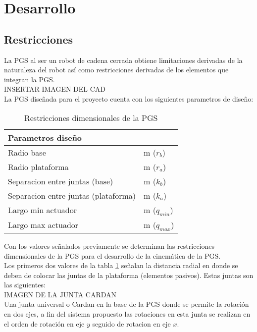 \documentclass[letterpaper, 12pt]{article}
\begin{document}
\section{Desarrollo}
\subsection{Restricciones}
La PGS al ser un robot de cadena cerrada obtiene limitaciones 
derivadas de la naturaleza del robot así como restricciones 
derivadas de los elementos que integran la PGS.\\

INSERTAR IMAGEN DEL CAD\\

La PGS diseñada para el proyecto cuenta con los siguientes 
parametros de diseño:

\begin{table}[h]\label{tab:restricciones}
\centering
\begin{tabular}{|ll|}
\hline
\multicolumn{2}{|l|}{\cellcolor[HTML]{EFEFEF}Parametros diseño} \\ \hline
Radio base & m ($r_b$)\\ \hline
Radio plataforma & m ($r_a$)\\ \hline
Separacion entre juntas (base) & m ($k_b$)\\ \hline
Separacion entre juntas (plataforma) & m ($k_a$)\\ \hline
Largo min actuador & m ($q_{min}$)\\ \hline
Largo max actuador & m ($q_{max}$)\\ \hline
\end{tabular}
\caption{Restricciones dimensionales de la PGS}
\end{table}

Con los valores señalados previamente se determinan las restricciones 
dimensionales de la PGS para el desarrollo de la cinemática de la PGS.\\

Los primeros dos valores de la tabla \ref{tab:restricciones} señalan 
la distancia radial en donde se deben de colocar las juntas de la 
plataforma (elementos pasivos). Estas juntas son las siguientes:\\

IMAGEN DE LA JUNTA CARDAN\\

Una junta universal o Cardan en la base de la PGS donde se permite la 
rotación en dos ejes, a fin del sistema propuesto las rotaciones en esta junta 
se realizan en el orden de rotación en eje $y$ seguido de rotacion en eje $x$.\\
\end{document}
